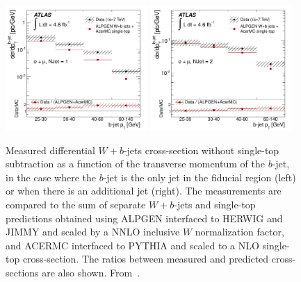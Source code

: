 \documentclass[11pt]{cernrep}
\begin{document}
\begin{figure}
\begin{center}
\includegraphics[width=0.48\textwidth]{fig_09a.pdf}
\includegraphics[width=0.48\textwidth]{fig_09b.pdf}
\caption{\label{fig:wb}
Measured differential $W+b$-jets cross-section without single-top subtraction as a function of the transverse momentum of the $b$-jet, in the 
case where the $b$-jet is the only jet in the fiducial region (left) or when there is an additional jet (right). 
The measurements are compared to the sum of separate $W+b$-jets and single-top predictions 
obtained using ALPGEN interfaced to HERWIG and JIMMY and scaled by a NNLO inclusive $W$ normalization factor, and ACERMC interfaced to PYTHIA and scaled to a 
NLO single-top cross-section. 
The ratios between measured and predicted cross-sections are also shown. From~\protect\cite{Aad:2013vka}.}
\end{center}
\end{figure}
\end{document}
